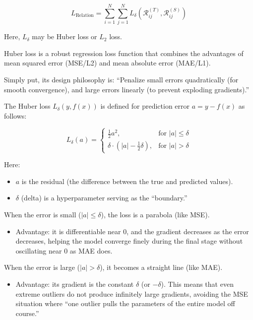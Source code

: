 \[
L_{\mathrm{Relation}} = \sum_{i=1}^{N} \sum_{j=1}^{N} L_\delta\left(\mathcal{R}_{ij}^{(T)}, \mathcal{R}_{ij}^{(S)}\right)
\]

Here, \(L_\delta\) may be Huber loss or \(L_2\) loss.

Huber loss is a robust regression loss function that combines the advantages of mean squared error (MSE/L2) and mean absolute error (MAE/L1).

Simply put, its design philosophy is: ``Penalize small errors quadratically (for smooth convergence), and large errors linearly (to prevent exploding gradients).''

The Huber loss \(L_\delta(y, f(x))\) is defined for prediction error \(a = y - f(x)\) as follows:

\[
L_\delta(a) =
\begin{cases}
\frac{1}{2}a^2, & \text{for } |a| \le \delta \\
\delta \cdot \left(|a| - \frac{1}{2}\delta\right), & \text{for } |a| > \delta
\end{cases}
\]

Here:

\begin{itemize}
\tightlist
\item
  \(a\) is the residual (the difference between the true and predicted values).
\item
  \(\delta\) (delta) is a hyperparameter serving as the ``boundary.''
\end{itemize}

When the error is small (\(|a| \le \delta\)), the loss is a parabola (like MSE).

\begin{itemize}
\tightlist
\item
  Advantage: it is differentiable near 0, and the gradient decreases as the error decreases, helping the model converge finely during the final stage without oscillating near 0 as MAE does.
\end{itemize}

When the error is large (\(|a| > \delta\)), it becomes a straight line (like MAE).

\begin{itemize}
\tightlist
\item
  Advantage: its gradient is the constant \(\delta\) (or \(-\delta\)). This means that even extreme outliers do not produce infinitely large gradients, avoiding the MSE situation where ``one outlier pulls the parameters of the entire model off course.''
\end{itemize}

